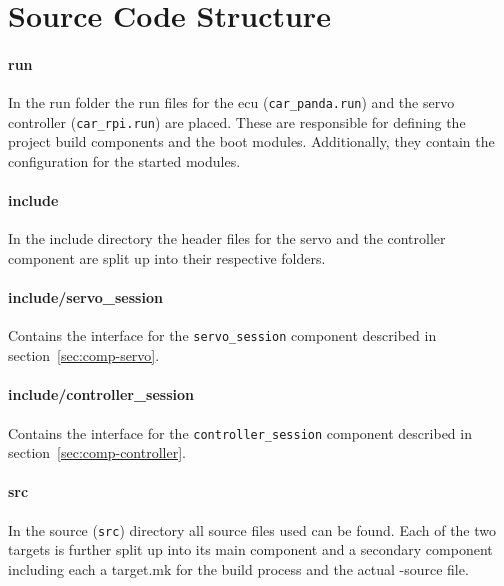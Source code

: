 \newpage

\section{Source Code Structure}



\paragraph{run}
In the run folder the run files for the ecu (\texttt{car\_panda.run}) and the servo controller (\texttt{car\_rpi.run}) are placed.
These are responsible for defining the project build components and the boot modules. Additionally, they contain the configuration for the started modules.

\paragraph{include}
In the include directory the header files for the servo and the controller component are split up into their respective folders.

\paragraph{include/servo\_session}
Contains the interface for the \texttt{servo\_session} component described in section~\ref{sec:comp-servo}.

\paragraph{include/controller\_session}
Contains the interface for the \texttt{controller\_session} component described in section~\ref{sec:comp-controller}.

\paragraph{src}
In the source (\texttt{src}) directory all source files used can be found.
Each of the two targets is further split up into its main component and a secondary component including each a target.mk for the build process and the actual \CC-source file.

